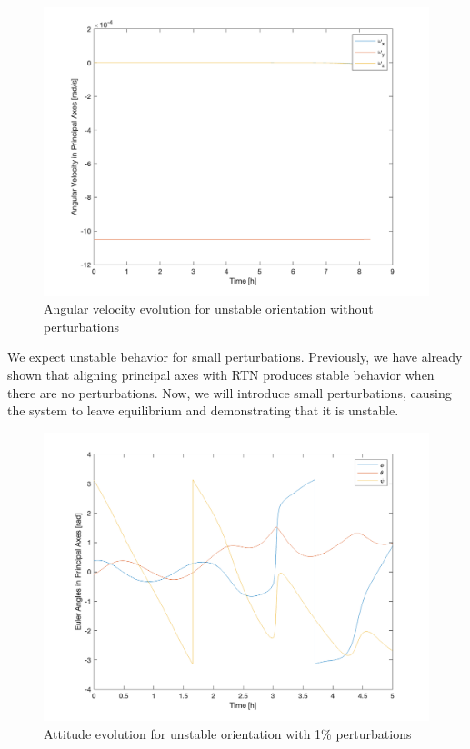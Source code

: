 \begin{figure}[H]
\centering
\includegraphics[scale=0.6]{Images/ps5_problem1b_angvel_unperturbed.png}
\caption{Angular velocity evolution for unstable orientation without perturbations}
\label{fig:ps5_problem1b_angvel_unperturbed}
\end{figure}

We expect unstable behavior for small perturbations. Previously, we have already shown that aligning principal axes with RTN produces stable behavior when there are no perturbations. Now, we will introduce small perturbations, causing the system to leave equilibrium and demonstrating that it is unstable.

\begin{figure}[H]
\centering
\includegraphics[scale=0.6]{Images/ps5_problem1b_angle.png}
\caption{Attitude evolution for unstable orientation with 1\% perturbations}
\label{fig:ps5_problem1b_angle}
\end{figure}

